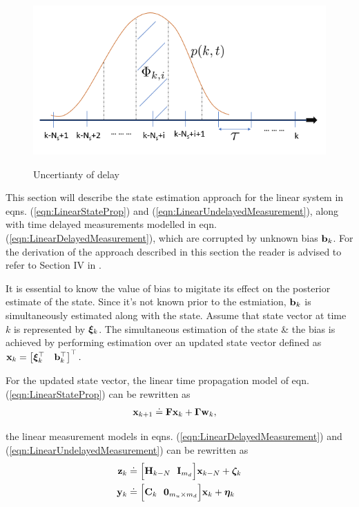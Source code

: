 \begin{figure}
	{\includegraphics[width=1.0\columnwidth]{./img/delay_uncertainty.png}}
	\caption{Uncertianty of delay}
	\label{fig:delay_uncertainty}
\end{figure}

This section will describe the state estimation approach for the linear system in eqns. (\ref{eqn:LinearStateProp}) and (\ref{eqn:LinearUndelayedMeasurement}), along with time delayed measurements modelled in eqn. (\ref{eqn:LinearDelayedMeasurement}), which are corrupted by unknown bias $\mathbf{b}_k$. 
For the derivation of the approach described in this section the reader is advised to refer to Section IV in \cite{choi2012state}.

It is essential to know the value of bias to migitate its effect on the posterior estimate of the state. Since it's not known prior to the estmiation, $\mathbf{b}_k$ is simultaneously estimated along with the state. 
Assume that state vector at time $k$ is represented by $\boldsymbol{\xi}_k$.
The simultaneous estimation of the state \& the bias is achieved by performing estimation over an updated state vector defined as 
$
	\mathbf{x}_k =
	\begin{bmatrix}
		\boldsymbol{\xi}_k^\top & \mathbf{b}_k^\top
	\end{bmatrix}^\top. 
$

For the updated state vector, the linear time propagation model of eqn. (\ref{eqn:LinearStateProp}) can be rewritten as
\begin{align}
	\label{eqn:LinearStateProp4UpdatedState}
	\mathbf{x}_{k+1} &\doteq \mathbf{F} \mathbf{x}_k + \boldsymbol{\Gamma} \mathbf{w}_k,
\end{align}

the linear measurement models in eqns. (\ref{eqn:LinearDelayedMeasurement}) and (\ref{eqn:LinearUndelayedMeasurement}) can be rewritten as
\begin{align}
	\label{eqn:LinearDelayedMeasurement4UpdatedState}
	\mathbf{z}_k &\doteq \Big[ \mathbf{H}_{k-N} \ \ \mathbf{I}_{m_d} \Big] \mathbf{x}_{k-N} +\boldsymbol{\zeta}_k \\
	\label{eqn:LinearUndelayedMeasurement4UpdatedState}
	\mathbf{y}_k &\doteq \Big[ \mathbf{C}_k \ \ \boldsymbol{0}_{m_u \times m_d} \Big] \mathbf{x}_k + \boldsymbol{\eta}_k
\end{align}


